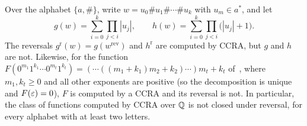 \begin{corollary}\label{cor:reversal}
Over the alphabet $\{a,\#\}$, write $w=u_0\#u_1\#\cdots\#u_k$ with $u_m\in a^*$, and let
\[
g(w)=\sum_{i=0}^k\prod_{j<i}|u_j| ,\qquad h(w)=\sum_{i=0}^k\prod_{j<i}\bigl(|u_j|+1\bigr).
\]
The reversals $g^{\mathrm r}(w)=g(w^{\mathrm{rev}})$ and $h^{\mathrm r}$ are computed by CCRA, but $g$ and $h$ are not. Likewise, for the function $F(0^{m_1}1^{k_1}\cdots0^{m_t}1^{k_t})=(\cdots((m_1+k_1)m_2+k_2)\cdots)m_t+k_t$ of~\cite[Example~52]{MPSfull}, where $m_1,k_t\ge0$ and all other exponents are positive (so the decomposition is unique and $F(\varepsilon)=0$), $F$ is computed by a CCRA and its reversal is not. In particular, the class of functions computed by CCRA over $\mathbb{Q}$ is not closed under reversal, for every alphabet with at least two letters.
\end{corollary}
